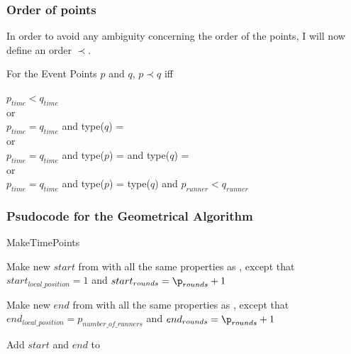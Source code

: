 \subsubsection{Order of points}
\label{order}
In order to avoid any ambiguity concerning the order of the points, I will now define an order $\prec$. 

\begin{defi}
For the Event Points $p$ and $q$, $p \prec q$ iff
\begin{center}
\label{orderOfPoints}
$p_{time} < q_{time}$\\
or \\
$p_{time} = q_{time}$ and type($q$) = \comFin\\
or \\
$p_{time} = q_{time}$ and type($p$) = \comStart and type($q$) = \comEnd \\
or \\
$p_{time} = q_{time}$ and type($p$) = type($q$) and $p_{runner} < q_{runner}$
\end{center}
\end{defi}

\subsubsection{Psudocode for the Geometrical Algorithm}

\begin{algorithm}[H]
\caption{MakeTimePoints}
\highlights
{}
 
Make new \startT $start$ from \p with all the same properties as \p, except that $start_{local\_position} = 1$ and $start_{rounds} = \p_{rounds} + 1$
  
Make new \eT $end$ from \p with all the same properties as \p, except that $end_{local\_position} = p_{number\_of\_runners}$ and $end_{rounds} = \p_{rounds} + 1$
    
Add $start$ and $end$ to \li

\return \li
\end{algorithm}

